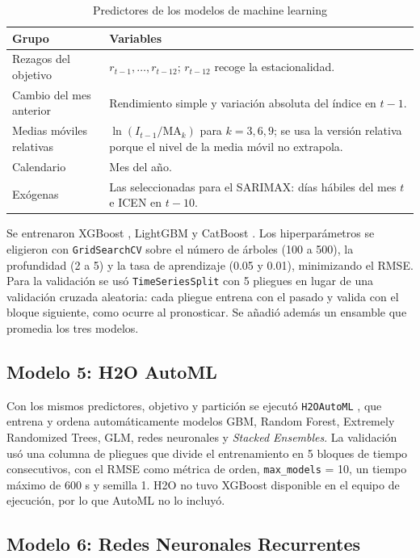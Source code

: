 \documentclass[conference]{IEEEtran}
\newcommand{\code}[1]{\texttt{#1}}
\begin{document}
\begin{table}[!htbp]
\centering
\caption{Predictores de los modelos de machine learning}
\label{tab:predictores}
\scriptsize
\begin{tabularx}{\columnwidth}{@{}lX@{}}
\toprule
\textbf{Grupo} & \textbf{Variables} \\
\midrule
Rezagos del objetivo & $r_{t-1},\dots,r_{t-12}$; $r_{t-12}$ recoge la estacionalidad. \\
Cambio del mes anterior & Rendimiento simple y variación absoluta del índice en $t-1$. \\
Medias móviles relativas & $\ln(I_{t-1}/\mathrm{MA}_k)$ para $k=3,6,9$; se usa la versión relativa porque el nivel de la media móvil no extrapola. \\
Calendario & Mes del año. \\
Exógenas & Las seleccionadas para el SARIMAX: días hábiles del mes $t$ e ICEN en $t-10$. \\
\bottomrule
\end{tabularx}
\end{table}

Se entrenaron XGBoost \cite{chen2016}, LightGBM \cite{ke2017} y CatBoost \cite{prokhorenkova2018}. Los hiperparámetros se eligieron con \code{GridSearchCV} sobre el número de árboles (100 a 500), la profundidad (2 a 5) y la tasa de aprendizaje (0.05 y 0.01), minimizando el RMSE. Para la validación se usó \code{TimeSeriesSplit} con 5 pliegues en lugar de una validación cruzada aleatoria: cada pliegue entrena con el pasado y valida con el bloque siguiente, como ocurre al pronosticar. Se añadió además un ensamble que promedia los tres modelos.

\subsection{Modelo 5: H2O AutoML}

Con los mismos predictores, objetivo y partición se ejecutó \code{H2OAutoML} \cite{ledell2020}, que entrena y ordena automáticamente modelos GBM, Random Forest, Extremely Randomized Trees, GLM, redes neuronales y \textit{Stacked Ensembles}. La validación usó una columna de pliegues que divide el entrenamiento en 5 bloques de tiempo consecutivos, con el RMSE como métrica de orden, \code{max\_models} = 10, un tiempo máximo de 600 s y semilla 1. H2O no tuvo XGBoost disponible en el equipo de ejecución, por lo que AutoML no lo incluyó.

\subsection{Modelo 6: Redes Neuronales Recurrentes}
\end{document}
